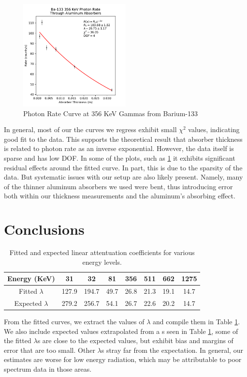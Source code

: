 \documentclass[12pt, letterpaper]{article}
\begin{document}
\begin{figure}[h]
    \centering
    \includegraphics[width=0.5\textwidth]{experiment1/figures/ba133/rates-356.pdf}
    \caption{Photon Rate Curve at 356 KeV Gammas from Barium-133}
    \label{fig:rates356}
\end{figure}

In general, most of our the curves we regress exhibit small $\chi^2$ values, indicating good fit to the data. This supports the theoretical result that absorber thickness is related to photon rate as an inverse exponential. However, the data itself is sparse and has low DOF. In some of the plots, such as \ref{fig:rates356} it exhibits significant residual effects around the fitted curve. In part, this is due to the sparsity of the data. But systematic issues with our setup are also likely present. Namely, many of the thinner aluminum absorbers we used were bent, thus introducing error both within our thickness measurements and the aluminum's absorbing effect. 

\section{Conclusions}\label{sec:conclusion}

\begin{table}[h]
\centering
\begin{tabular}{|c | c c c c c c c |}
    \hline
    Energy (KeV) & 31 & 32 & 81 & 356 & 511 & 662 & 1275 \\
    \hline
    Fitted $\lambda$ & 127.9 & 194.7 & 49.7 & 26.8 & 21.3 & 19.1 & 14.7 \\
    Expected $\lambda$ & 279.2 & 256.7 & 54.1 & 26.7 & 22.6 & 20.2 & 14.7 \\
    \hline
\end{tabular}
\caption{Fitted and expected linear attentuation coefficients for various energy levels.}
\label{table:1}
\end{table}

From the fitted curves, we extract the values of $\lambda$ and compile them in Table \ref{table:1}. We also include expected values extrapolated from a s seen in Table \ref{table:1}, some of the fitted $\lambda$s are close to the expected values, but exhibit bias and margins of error that are too small. Other $\lambda$s stray far from the expectation. In general, our estimates are worse for low energy radiation, which may be attributable to poor spectrum data in those areas. 
\end{document}
